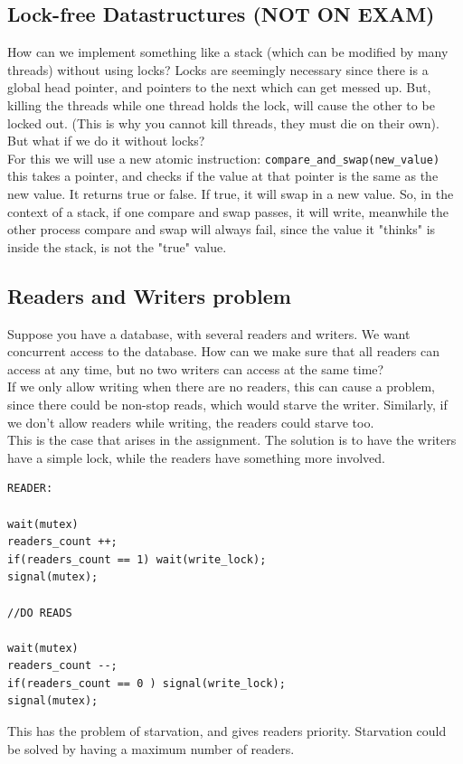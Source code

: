 \documentclass[12pt]{article}
\theoremstyle{definition}
\begin{document}
\subsection{Lock-free Datastructures (NOT ON EXAM)}
How can we implement something like a stack (which can be modified by many threads) without using locks? Locks are seemingly necessary since there is a global head pointer, and pointers to the next which can get messed up. But, killing the threads while one thread holds the lock, will cause the other to be locked out. (This is why you cannot kill threads, they must die on their own). But what if we do it without locks?
\\ \linebreak
For this we will use a new atomic instruction: \texttt{compare\_and\_swap(new\_value)} this takes a pointer, and checks if the value at that pointer is the same as the new value. It returns true or false. If true, it will swap in a new value. So, in the context of a stack, if one compare and swap passes, it will write, meanwhile the other process compare and swap will always fail, since the value it "thinks" is inside the stack, is not the "true" value.
\\ \linebreak

\subsection{Readers and Writers problem}
Suppose you have a database, with several readers and writers. We want concurrent access to the database. How can we make sure that all readers can access at any time, but no two writers can access at the same time? 
\\ \linebreak
If we only allow writing when there are no readers, this can cause a problem, since there could be non-stop reads, which would starve the writer. Similarly, if we don't allow readers while writing, the readers could starve too.
\\ \linebreak
This is the case that arises in the assignment. The solution is to have the writers have a simple lock, while the readers have something more involved.
\begin{lstlisting}
READER:

wait(mutex)
readers_count ++;
if(readers_count == 1) wait(write_lock);
signal(mutex);

//DO READS

wait(mutex)
readers_count --;
if(readers_count == 0 ) signal(write_lock);
signal(mutex);

\end{lstlisting}
This has the problem of starvation, and gives readers priority. Starvation could be solved by having a maximum number of readers.
\\ \linebreak
\end{document}
